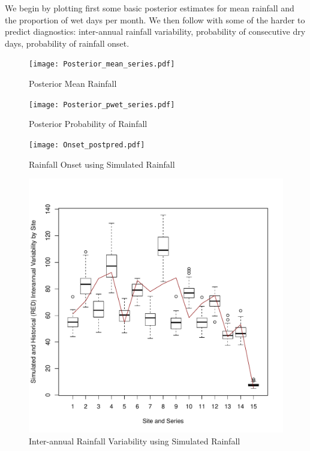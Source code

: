 \documentclass[12pt]{article}
\begin{document}
We begin by plotting first some basic posterior estimates for mean rainfall and the proportion of wet days per month. We then follow with some of the harder to predict diagnostics: inter-annual rainfall variability, probability of consecutive dry days, probability of rainfall onset.



\begin{figure}[htbp]
\caption{Posterior Mean Rainfall }
\begin{center}
\texttt{[image: Posterior\_mean\_series.pdf]}
\end{center}
\end{figure}

\begin{figure}[htbp]
\caption{Posterior Probability of Rainfall}
\begin{center}
\texttt{[image: Posterior\_pwet\_series.pdf]}
\end{center}
\end{figure}


\begin{figure}[htbp]
\caption{Rainfall Onset using Simulated Rainfall}
\begin{center}
\texttt{[image: Onset\_postpred.pdf]}
\end{center}
\end{figure}


\begin{figure}[htbp]
\caption{Inter-annual Rainfall Variability using Simulated Rainfall}
\begin{center}
\includegraphics[width=5.0in]{Interannual.pdf}
\end{center}
\end{figure}
\end{document}
